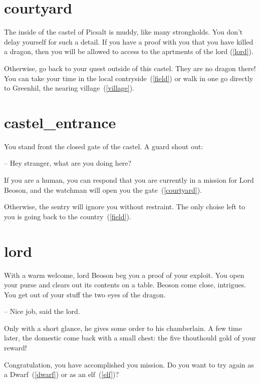 \section{courtyard}

The inside of the castel of Picsalt is muddy, like many strongholds. You don't
delay yourself for such a detail. If you have a proof with you that you have
killed a dragon, then you will be allowed to access to the aprtments of the lord
(\ref{lord}).

Otherwise, go back to your quest outside of this castel. They are no dragon
there! You can take your time in the local contryside~(\ref{field}) or walk in
one go directly to Greenhil, the nearing village~(\ref{village}).

\section{castel_entrance}

You stand front the closed gate of the castel. A guard shout out:

-- Hey stranger, what are you doing here?

If you are a human, you can respond that you are currently in a mission for Lord
Beoson, and the watchman will open you the gate~(\ref{courtyard}).

Otherwise, the sentry will ignore you without restraint. The only choise
left to you is going back to the country~(\ref{field}).

\section{lord}

With a warm welcome, lord Beoson beg you a proof of your exploit.  You open
your purse and clears out its contents on a table. Beoson come close,
intrigues. You get out of your stuff the two eyes of the dragon.

-- Nice job, said the lord.

Only with a short glance, he gives some order to his chamberlain. A few time
later, the domestic come back with a small chest: the five thouthould gold of
your reward!

\medbreak

Congratulation, you have accomplished you mission. Do you want to try again as a
Dwarf~(\ref{dwarf}) or as an elf~(\ref{elf})?

